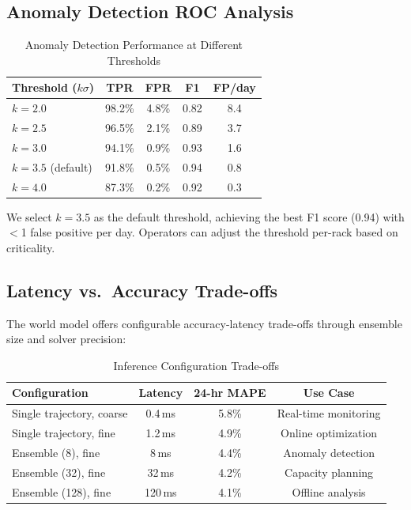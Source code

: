 \documentclass[conference,10pt]{IEEEtran}
\begin{document}
\subsection{Anomaly Detection ROC Analysis}

\begin{table}[!htbp]
\caption{Anomaly Detection Performance at Different Thresholds}
\label{tab:roc}
\centering\scriptsize
\begin{tabular}{@{}lcccc@{}}
\toprule
\textbf{Threshold ($k\sigma$)} & \textbf{TPR} & \textbf{FPR} & \textbf{F1} & \textbf{FP/day} \\
\midrule
$k=2.0$ & 98.2\% & 4.8\% & 0.82 & 8.4 \\
$k=2.5$ & 96.5\% & 2.1\% & 0.89 & 3.7 \\
$k=3.0$ & 94.1\% & 0.9\% & 0.93 & 1.6 \\
$k=3.5$ (default) & 91.8\% & 0.5\% & 0.94 & 0.8 \\
$k=4.0$ & 87.3\% & 0.2\% & 0.92 & 0.3 \\
\bottomrule
\end{tabular}
\end{table}

We select $k=3.5$ as the default threshold, achieving the best F1 score (0.94) with $<$1 false positive per day. Operators can adjust the threshold per-rack based on criticality.

\subsection{Latency vs.\ Accuracy Trade-offs}

The world model offers configurable accuracy-latency trade-offs through ensemble size and solver precision:

\begin{table}[!htbp]
\caption{Inference Configuration Trade-offs}
\label{tab:tradeoff}
\centering\scriptsize
\begin{tabular}{@{}lccc@{}}
\toprule
\textbf{Configuration} & \textbf{Latency} & \textbf{24-hr MAPE} & \textbf{Use Case} \\
\midrule
Single trajectory, coarse & 0.4\,ms & 5.8\% & Real-time monitoring \\
Single trajectory, fine & 1.2\,ms & 4.9\% & Online optimization \\
Ensemble (8), fine & 8\,ms & 4.4\% & Anomaly detection \\
Ensemble (32), fine & 32\,ms & 4.2\% & Capacity planning \\
Ensemble (128), fine & 120\,ms & 4.1\% & Offline analysis \\
\bottomrule
\end{tabular}
\end{table}
\end{document}
